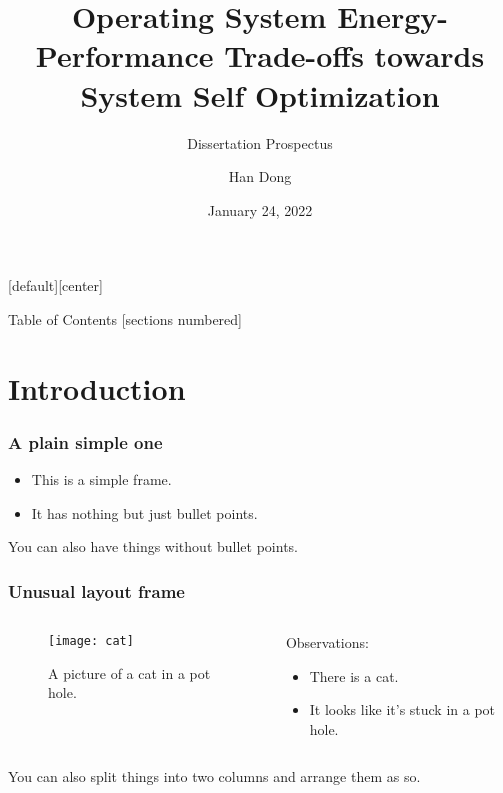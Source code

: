 \documentclass[10pt,xcolor=table]{beamer}
\title{Operating System Energy-Performance Trade-offs towards System Self Optimization}
\subtitle{Dissertation Prospectus}
\date{January 24, 2022}
\author{Han Dong}
\begin{document}
{
\maketitle
}

[default][center]

\begin{frame}[plain]{Table of Contents}
  [sections numbered]
  \tableofcontents[hideallsubsections]
\end{frame}

\section{Introduction}
\begin{frame}
  \frametitle{A plain simple one}
  \begin{itemize}
  \item This is a simple frame.
  \item It has nothing but just bullet points.
  \end{itemize}
  You can also have things without bullet points.
\end{frame}

\begin{frame}
  \frametitle{Unusual layout frame}
  \begin{columns}
    \begin{column}{.44\textwidth}
      \begin{figure}[t]
        \texttt{[image: cat]}
        \caption{A picture of a cat in a pot hole\footnotemark[1].}
      \end{figure}
    \end{column}
    \begin{column}{.60\textwidth}
      Observations:
        \begin{itemize}
        \item There is a cat.
        \item It looks like it's stuck in a pot hole.
        \end{itemize}
    \end{column}
  \end{columns}

  You can also split things into two columns and arrange them as so.
  
  \vspace{0.8cm}
\end{frame}
\end{document}

